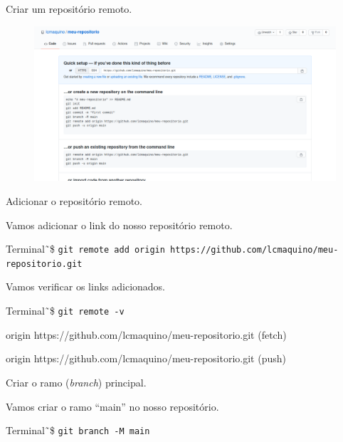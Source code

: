 \documentclass[brazil,aspectratio=169]{beamer}
\newcommand{\terminal}[1]{\textcolor{my-green}{\texttt{#1}}}
\begin{document}
\begin{frame}{Criar um repositório remoto.}

  \begin{figure}
    \centering
    \includegraphics[scale=0.3]{imagens/novo-repositorio-github-3}
  \end{figure}

\end{frame}

\begin{frame}{Adicionar o repositório remoto.}

  Vamos adicionar o link do nosso repositório remoto.

  \begin{exampleblock}{Terminal}
    \~\,\$ \terminal{git remote add origin https://github.com/lcmaquino/meu-repositorio.git}
  \end{exampleblock}

  Vamos verificar os links adicionados.

  \begin{exampleblock}{Terminal}
    \~\,\$ \terminal{git remote -v}

    origin	https://github.com/lcmaquino/meu-repositorio.git (fetch)

    origin	https://github.com/lcmaquino/meu-repositorio.git (push)

  \end{exampleblock}
  
\end{frame}

\begin{frame}{Criar o ramo (\textit{branch}) principal.}

  Vamos criar o ramo ``main'' no nosso repositório.

  \begin{exampleblock}{Terminal}
    \~\,\$ \terminal{git branch -M main}
  \end{exampleblock}
  
\end{frame}
\end{document}
